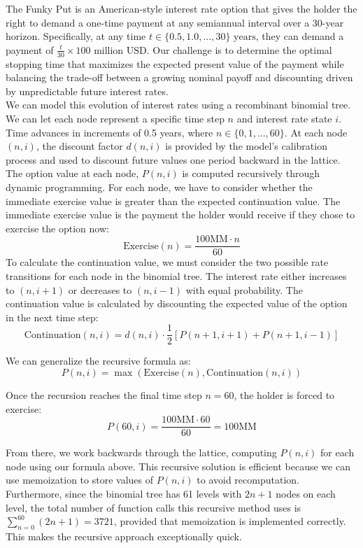 \documentclass{report}
\begin{document}
The Funky Put is an American-style interest rate option that gives the holder the right to demand a one-time payment at any semiannual interval over a 30-year horizon. Specifically, at any time $t \in \{0.5, 1.0, ..., 30\} \text{ years}$, they can demand a payment of $\frac{t}{30} \times 100 \text{ million USD}$. Our challenge is to determine the optimal stopping time that maximizes the expected present value of the payment while balancing the trade-off between a growing nominal payoff and discounting driven by unpredictable future interest rates. \\

We can model this evolution of interest rates using a recombinant binomial tree. We can let each node represent a specific time step $n$ and interest rate state $i$. Time advances in increments of 0.5 years, where $n \in \{0, 1, ..., 60\}$. At each node $\left(n, i\right)$, the discount factor $d(n, i)$ is provided by the model's calibration process and used to discount future values one period backward in the lattice. \\

The option value at each node, $P(n, i)$ is computed recursively through dynamic programming. For each node, we have to consider whether the immediate exercise value is greater than the expected continuation value. The immediate exercise value is the payment the holder would receive if they chose to exercise the option now:
\[
\text{Exercise}(n) = \frac{100 \text{MM} \cdot n}{60}
\]
To calculate the continuation value, we must consider the two possible rate transitions for each node in the binomial tree. The interest rate either increases to $(n, i + 1)$ or decreases to $(n, i - 1)$ with equal probability. The continuation value is calculated by discounting the expected value of the option in the next time step:
\[
\text{Continuation}(n, i) = d(n, i) \cdot \frac{1}{2}\left[P(n + 1, i + 1) + P(n + 1, i - 1)\right]
\]

We can generalize the recursive formula as:
\[
P(n, i)=\max \left(\text{Exercise}(n), \text{Continuation}(n, i)\right)
\]

Once the recursion reaches the final time step $n = 60$, the holder is forced to exercise:
\[
P(60, i)=\frac{100 \text{MM} \cdot 60}{60}=100 \text{MM}
\]

From there, we work backwards through the lattice, computing $P(n, i)$ for each node using our formula above. This recursive solution is efficient because we can use memoization to store values of $P(n, i)$ to avoid recomputation. Furthermore, since the binomial tree has 61 levels with $2n + 1$ nodes on each level, the total number of function calls this recursive method uses is $\sum_{n=0}^{60}\left(2n+1\right)=3721$, provided that memoization is implemented correctly. This makes the recursive approach exceptionally quick. \\
\end{document}
